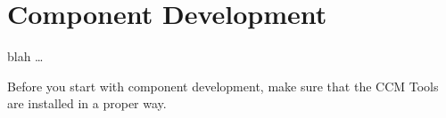 \chapter{Component Development}

blah \dots

Before you start with component development, make sure that the CCM Tools are
installed in a proper way.

\newpage

\newpage

\newpage


\newpage

